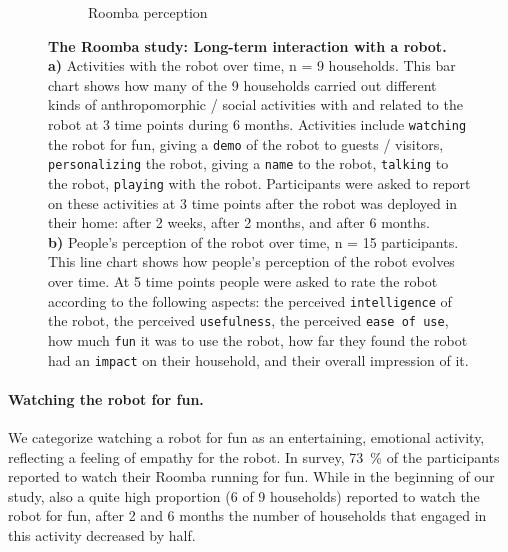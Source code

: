 \documentclass{frontiersSCNS} %
\begin{document}
\begin{figure}
\begin{subfigure}[b]{0.48\columnwidth}
                \caption{Roomba perception}
                \label{fig:roomba-perception}
        \end{subfigure}
        \caption{\textbf{The Roomba study: Long-term interaction with a robot.\\}
    \textbf{a)} Activities with the robot over time, n = 9 households. This bar
        chart shows how many of the 9 households carried out different kinds of
        anthropomorphic / social activities with and related to the robot at 3
        time points during 6 months. Activities include \texttt{watching} the
        robot for fun, giving a \texttt{demo} of the robot to guests / visitors,
        \texttt{personalizing} the robot, giving a \texttt{name} to the robot,
        \texttt{talking} to the robot, \texttt{playing} with the robot.
        Participants were asked to report on these activities at 3 time points
        after the robot was deployed in their home: after 2 weeks, after 2 months,
        and after 6 months.\\
	\textbf{b)} People's perception of the robot over time, n = 15 participants.
    		This line chart shows how people's perception of the robot evolves over
    		time. At 5 time points people were asked to rate the robot according to the
    		following aspects: the perceived \texttt{intelligence} of the robot, the
    		perceived \texttt{usefulness}, the perceived \texttt{ease of use}, how much
    		\texttt{fun} it was to use the robot, how far they found the robot had an
    		\texttt{impact} on their household, and their {overall} impression of it.}
    		\label{fig:roomba-study}
\end{figure}


\paragraph*{Watching the robot for fun.} We categorize watching a robot for fun
as an entertaining, emotional activity, reflecting a feeling of empathy for the
robot. In \cite{sung_housewives_2008} survey, 73~\% of the participants reported
to watch their Roomba running for fun. While in the beginning of our study, also
a quite high proportion (6 of 9 households) reported to watch the robot for fun,
after 2 and 6 months the number of households that engaged in this activity
decreased by half. 
\end{document}
